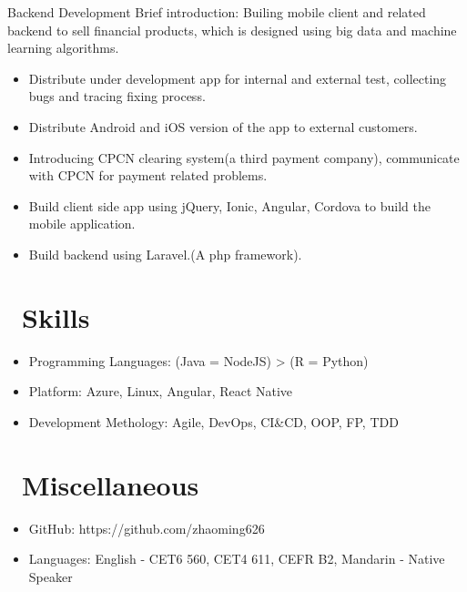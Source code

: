 \documentclass{resume}
\begin{document}
 {Backend Development}
Brief introduction: Builing mobile client and related backend to sell financial products, which is designed using big data and machine learning algorithms.
\begin{itemize}
  \item Distribute under development app for internal and external test, collecting bugs and tracing fixing process.
  \item Distribute Android and iOS version of the app to external customers.
  \item Introducing CPCN clearing system(a third payment company), communicate with CPCN for payment related problems.
  \item Build client side app using jQuery, Ionic, Angular, Cordova to build the mobile application. 
  \item Build backend using Laravel.(A php framework).
\end{itemize}



\section{\faCogs\ Skills}
\begin{itemize}[parsep=0.5ex]
  \item Programming Languages: (Java = NodeJS) > (R = Python) 
  \item Platform: Azure, Linux, Angular, React Native
  \item Development Methology: Agile, DevOps, CI\&CD, OOP, FP, TDD
\end{itemize}

\section{\faInfo\ Miscellaneous}
\begin{itemize}[parsep=0.5ex]
  \item GitHub: https://github.com/zhaoming626
  \item Languages: English - CET6 560, CET4 611, CEFR B2, Mandarin - Native Speaker
\end{itemize}

%
%
\end{document}
